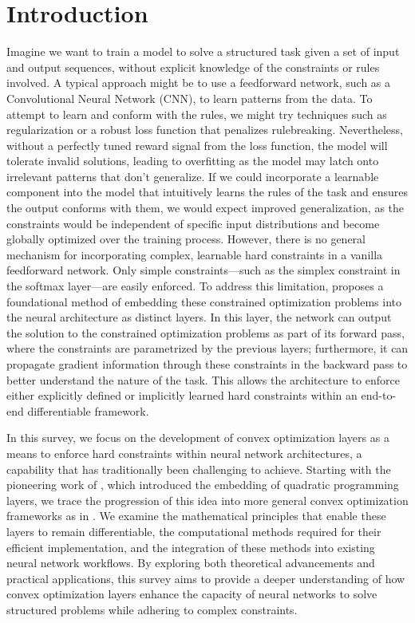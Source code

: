\documentclass{article}
\begin{document}
\section{Introduction}
\label{sec:intro}
Imagine we want to train a model to solve a structured task given a set of input and output sequences, without explicit knowledge of the constraints or rules involved. A typical approach might be to use a feedforward network, such as a Convolutional Neural Network (CNN), to learn patterns from the data. To attempt to learn and conform with the rules, we might try techniques such as regularization or a robust loss function that penalizes rulebreaking. Nevertheless, without a perfectly tuned reward signal from the loss function, the model will tolerate invalid solutions, leading to overfitting as the model may latch onto irrelevant patterns that don’t generalize. If we could incorporate a learnable component into the model that intuitively learns the rules of the task and ensures the output conforms with them, we would expect improved generalization, as the constraints would be independent of specific input distributions and become globally optimized over the training process. However, there is no general mechanism for incorporating complex, learnable hard constraints in a vanilla feedforward network. Only simple constraints—such as the simplex constraint in the softmax layer—are easily enforced. To address this limitation, \citet{optnet} proposes a foundational method of embedding these constrained optimization problems into the neural architecture as distinct layers. In this layer, the network can output the solution to the constrained optimization problems as part of its forward pass, where the constraints are parametrized by the previous layers; furthermore, it can propagate gradient information through these constraints in the backward pass to better understand the nature of the task. This allows the architecture to enforce either explicitly defined or implicitly learned hard constraints within an end-to-end differentiable framework. 

In this survey, we focus on the development of convex optimization layers as a means to enforce hard constraints within neural network architectures, a capability that has traditionally been challenging to achieve. Starting with the pioneering work of \citet{optnet}, which introduced the embedding of quadratic programming layers, we trace the progression of this idea into more general convex optimization frameworks as in \citet{differentiableconvexoptimizationlayers}. We examine the mathematical principles that enable these layers to remain differentiable, the computational methods required for their efficient implementation, and the integration of these methods into existing neural network workflows. By exploring both theoretical advancements and practical applications, this survey aims to provide a deeper understanding of how convex optimization layers enhance the capacity of neural networks to solve structured problems while adhering to complex constraints. 
\end{document}
